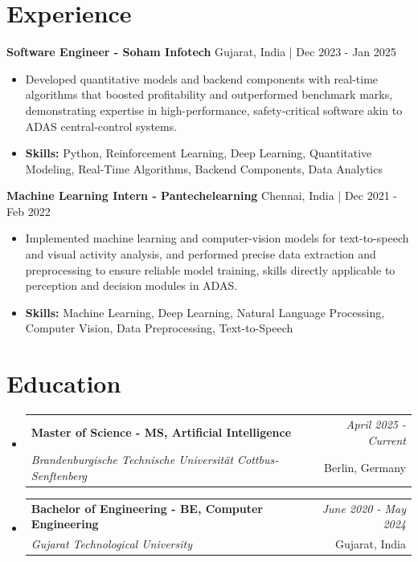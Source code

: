 \documentclass[a4paper,11pt]{article}
\makeatletter
\newcommand{\resumeSubheading}[4]{
\vspace{0.5mm}\item
    \begin{tabular*}{\linewidth}[t]{l@{\extracolsep{\fill}}r}
        \textbf{#1} & \textit{\footnotesize{#4}} \\
        \textit{\footnotesize{#3}} &  \footnotesize{#2}\\
    \end{tabular*}
    \vspace{-2.4mm}
}
\makeatother
\begin{document}
\section{\textbf{Experience}}


\vspace{1mm}
  \textbf{Software Engineer - Soham Infotech} \hfill Gujarat, India | Dec 2023 - Jan 2025
\vspace{-1.5mm} %
\begin{itemize}
  \item Developed quantitative models and backend components with real-time algorithms that boosted profitability and outperformed benchmark marks, demonstrating expertise in high-performance, safety-critical software akin to ADAS central-control systems.

\vspace{-2mm}
  \item \textbf{Skills:} Python, Reinforcement Learning, Deep Learning, Quantitative Modeling, Real-Time Algorithms, Backend Components, Data Analytics
\end{itemize}

\vspace{1mm}
  \textbf{Machine Learning Intern - Pantechelearning} \hfill Chennai, India | Dec 2021 - Feb 2022
\vspace{-1.5mm} %
\begin{itemize}
  \item Implemented machine learning and computer-vision models for text-to-speech and visual activity analysis, and performed precise data extraction and preprocessing to ensure reliable model training, skills directly applicable to perception and decision modules in ADAS.
\vspace{-2mm}
  \item \textbf{Skills:} Machine Learning, Deep Learning, Natural Language Processing, Computer Vision, Data Preprocessing, Text-to-Speech
\end{itemize}\section{\textbf{Education}}
\vspace{-0.4mm}

\begin{itemize}[leftmargin=0.15in, label={}]
\resumeSubheading
{Master of Science - MS, Artificial Intelligence }{Berlin, Germany}
{Brandenburgische Technische Universität Cottbus-Senftenberg  }{April 2025 - Current}

\vspace{1.0mm} %
\resumeSubheading
{Bachelor of Engineering - BE, Computer Engineering  }{Gujarat, India}
{Gujarat Technological University }{June 2020 - May 2024}

\end{itemize}
\end{document}
